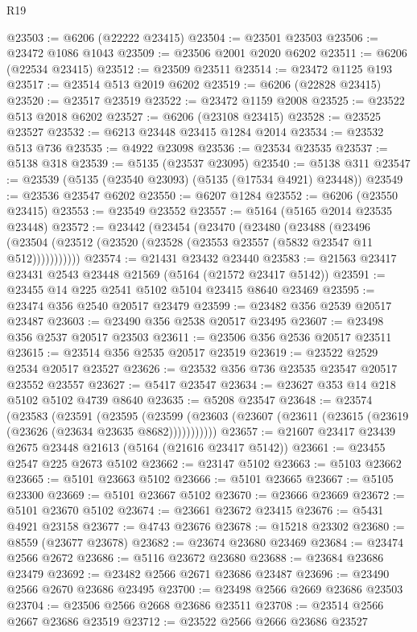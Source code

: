 \begin{lexlean}{R19}
\begin{coremodule}
{{{{{{{{{{{@23503 := @6206 (@22222 @23415)
@23504 := @23501 @23503
@23506 := @23472 @1086 @1043
@23509 := @23506 @2001 @2020 @6202
@23511 := @6206 (@22534 @23415)
@23512 := @23509 @23511
@23514 := @23472 @1125 @193
@23517 := @23514 @513 @2019 @6202
@23519 := @6206 (@22828 @23415)
@23520 := @23517 @23519
@23522 := @23472 @1159 @2008
@23525 := @23522 @513 @2018 @6202
@23527 := @6206 (@23108 @23415)
@23528 := @23525 @23527
@23532 := @6213 @23448 @23415 @1284 @2014
@23534 := @23532 @513 @736
@23535 := @4922 @23098
@23536 := @23534 @23535
@23537 := @5138 @318
@23539 := @5135 (@23537 @23095)
@23540 := @5138 @311
@23547 := @23539 (@5135 (@23540 @23093) (@5135 (@17534 @4921) @23448))
@23549 := @23536 @23547 @6202
@23550 := @6207 @1284
@23552 := @6206 (@23550 @23415)
@23553 := @23549 @23552
@23557 := @5164 (@5165 @2014 @23535 @23448)
@23572 := @23442
    (@23454
      (@23470
        (@23480
          (@23488
            (@23496 (@23504 (@23512 (@23520 (@23528 (@23553 @23557 (@5832 @23547 @11 @512)))))))))))
@23574 := @21431 @23432 @23440
@23583 := @21563 @23417 @23431 @2543 @23448 @21569 (@5164 (@21572 @23417 @5142))
@23591 := @23455 @14 @225 @2541 @5102 @5104 @23415 @8640 @23469
@23595 := @23474 @356 @2540 @20517 @23479
@23599 := @23482 @356 @2539 @20517 @23487
@23603 := @23490 @356 @2538 @20517 @23495
@23607 := @23498 @356 @2537 @20517 @23503
@23611 := @23506 @356 @2536 @20517 @23511
@23615 := @23514 @356 @2535 @20517 @23519
@23619 := @23522 @2529 @2534 @20517 @23527
@23626 := @23532 @356 @736 @23535 @23547 @20517 @23552 @23557
@23627 := @5417 @23547
@23634 := @23627 @353 @14 @218 @5102 @5102 @4739 @8640
@23635 := @5208 @23547
@23648 := @23574
    (@23583
      (@23591
        (@23595
          (@23599 (@23603 (@23607 (@23611 (@23615 (@23619 (@23626 (@23634 @23635 @8682)))))))))))
@23657 := @21607 @23417 @23439 @2675 @23448 @21613 (@5164 (@21616 @23417 @5142))
@23661 := @23455 @2547 @225 @2673 @5102
@23662 := @23147 @5102
@23663 := @5103 @23662
@23665 := @5101 @23663 @5102
@23666 := @5101 @23665
@23667 := @5105 @23300
@23669 := @5101 @23667 @5102
@23670 := @23666 @23669
@23672 := @5101 @23670 @5102
@23674 := @23661 @23672 @23415
@23676 := @5431 @4921 @23158
@23677 := @4743 @23676
@23678 := @15218 @23302
@23680 := @8559 (@23677 @23678)
@23682 := @23674 @23680 @23469
@23684 := @23474 @2566 @2672
@23686 := @5116 @23672 @23680
@23688 := @23684 @23686 @23479
@23692 := @23482 @2566 @2671 @23686 @23487
@23696 := @23490 @2566 @2670 @23686 @23495
@23700 := @23498 @2566 @2669 @23686 @23503
@23704 := @23506 @2566 @2668 @23686 @23511
@23708 := @23514 @2566 @2667 @23686 @23519
@23712 := @23522 @2566 @2666 @23686 @23527
}}}}}}}}}}}
\end{coremodule}
\end{lexlean}
